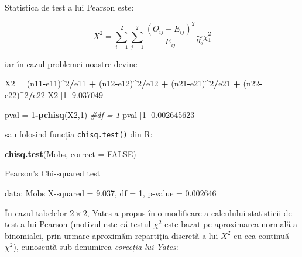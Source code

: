\documentclass[]{article}
\newenvironment{Shaded}{\begin{snugshade}}{\end{snugshade}}
\newcommand{\KeywordTok}[1]{\textcolor[rgb]{0.13,0.29,0.53}{\textbf{#1}}}
\newcommand{\DataTypeTok}[1]{\textcolor[rgb]{0.13,0.29,0.53}{#1}}
\newcommand{\DecValTok}[1]{\textcolor[rgb]{0.00,0.00,0.81}{#1}}
\newcommand{\FloatTok}[1]{\textcolor[rgb]{0.00,0.00,0.81}{#1}}
\newcommand{\StringTok}[1]{\textcolor[rgb]{0.31,0.60,0.02}{#1}}
\newcommand{\CommentTok}[1]{\textcolor[rgb]{0.56,0.35,0.01}{\textit{#1}}}
\newcommand{\OtherTok}[1]{\textcolor[rgb]{0.56,0.35,0.01}{#1}}
\newcommand{\OperatorTok}[1]{\textcolor[rgb]{0.81,0.36,0.00}{\textbf{#1}}}
\newcommand{\NormalTok}[1]{#1}
\begin{document}

Statistica de test a lui Pearson este:

\[
  X^2 = \sum_{i=1}^{2}\sum_{j=1}^{2}\frac{\left(O_{ij}-E_{ij}\right)^2}{E_{ij}}\underset{H_0}{\sim}\chi_1^2
\]

iar în cazul problemei noastre devine

\begin{Shaded}
\begin{Highlighting}[]
\NormalTok{X2 =}\StringTok{ }\NormalTok{(n11}\OperatorTok{-}\NormalTok{e11)}\OperatorTok{^}\DecValTok{2}\OperatorTok{/}\NormalTok{e11 }\OperatorTok{+}\StringTok{ }\NormalTok{(n12}\OperatorTok{-}\NormalTok{e12)}\OperatorTok{^}\DecValTok{2}\OperatorTok{/}\NormalTok{e12 }\OperatorTok{+}\StringTok{ }
\StringTok{  }\NormalTok{(n21}\OperatorTok{-}\NormalTok{e21)}\OperatorTok{^}\DecValTok{2}\OperatorTok{/}\NormalTok{e21 }\OperatorTok{+}\StringTok{ }\NormalTok{(n22}\OperatorTok{-}\NormalTok{e22)}\OperatorTok{^}\DecValTok{2}\OperatorTok{/}\NormalTok{e22}
\NormalTok{X2}
\NormalTok{[}\DecValTok{1}\NormalTok{] }\FloatTok{9.037049}

\NormalTok{pval =}\StringTok{ }\DecValTok{1}\OperatorTok{-}\KeywordTok{pchisq}\NormalTok{(X2,}\DecValTok{1}\NormalTok{) }\CommentTok{#df = 1}
\NormalTok{pval}
\NormalTok{[}\DecValTok{1}\NormalTok{] }\FloatTok{0.002645623}
\end{Highlighting}
\end{Shaded}

sau folosind funcția \texttt{chisq.test()} din R:

\begin{Shaded}
\begin{Highlighting}[]
\KeywordTok{chisq.test}\NormalTok{(Mobs, }\DataTypeTok{correct =} \OtherTok{FALSE}\NormalTok{)}

\NormalTok{    Pearson}\StringTok{'s Chi-squared test}

\StringTok{data:  Mobs}
\StringTok{X-squared = 9.037, df = 1, p-value = 0.002646}
\end{Highlighting}
\end{Shaded}

În cazul tabelelor \(2\times 2\), Yates a propus în \citep{Yates1934} o
modificare a calculului statisticii de test a lui Pearson (motivul este
că testul \(\chi^2\) este bazat pe aproximarea normală a binomialei,
prin urmare aproximăm repartiția discretă a lui \(X^2\) cu cea continuă
\(\chi^2\)), cunoscută sub denumirea \emph{corecția lui Yates}:
\end{document}
